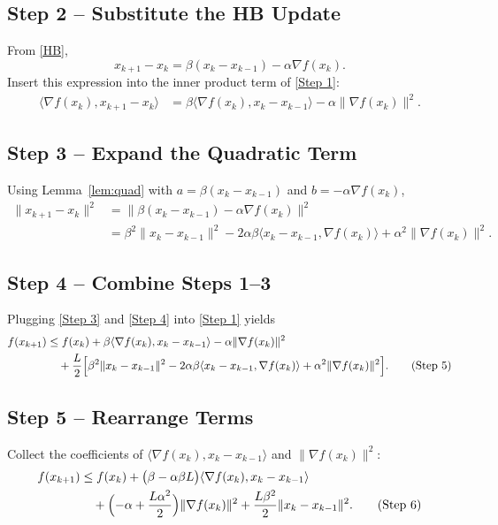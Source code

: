 \documentclass{article}
\begin{document}
\subsection*{Step 2 – Substitute the HB Update}
From \eqref{HB},
\[
x_{k+1}-x_k = \beta (x_k-x_{k-1})-\alpha \nabla f(x_k). \tag{Step 2}
\]
Insert this expression into the inner product term of \eqref{Step 1}:
\begin{align}
\bigl\langle\nabla f(x_k),x_{k+1}-x_k\bigr\rangle
&= \beta\langle\nabla f(x_k),x_k-x_{k-1}\rangle
   -\alpha\|\nabla f(x_k)\|^{2}. \tag{Step 3}
\end{align}

\subsection*{Step 3 – Expand the Quadratic Term}
Using Lemma~\ref{lem:quad} with $a=\beta (x_k-x_{k-1})$ and
$b=-\alpha \nabla f(x_k)$,
\begin{align}
\|x_{k+1}-x_k\|^{2}
&= \|\beta (x_k-x_{k-1})-\alpha \nabla f(x_k)\|^{2} \nonumber\\
&= \beta^{2}\|x_k-x_{k-1}\|^{2}
   -2\alpha\beta\langle x_k-x_{k-1},\nabla f(x_k)\rangle
   +\alpha^{2}\|\nabla f(x_k)\|^{2}. \tag{Step 4}
\end{align}

\subsection*{Step 4 – Combine Steps 1–3}
Plugging \eqref{Step 3} and \eqref{Step 4} into \eqref{Step 1} yields
\begin{align}
f(x_{k+1})
&\le f(x_k)
   +\beta\langle\nabla f(x_k),x_k-x_{k-1}\rangle
   -\alpha\|\nabla f(x_k)\|^{2} \nonumber\\
&\quad +\frac{L}{2}\Bigl[
        \beta^{2}\|x_k-x_{k-1}\|^{2}
        -2\alpha\beta\langle x_k-x_{k-1},\nabla f(x_k)\rangle
        +\alpha^{2}\|\nabla f(x_k)\|^{2}
        \Bigr]. \tag{Step 5}
\end{align}

\subsection*{Step 5 – Rearrange Terms}
Collect the coefficients of $\langle\nabla f(x_k),x_k-x_{k-1}\rangle$ and
$\|\nabla f(x_k)\|^{2}$:
\begin{align}
f(x_{k+1})
&\le f(x_k)
   +\bigl(\beta -\alpha\beta L\bigr)\langle\nabla f(x_k),x_k-x_{k-1}\rangle \nonumber\\
&\quad +\Bigl(-\alpha +\frac{L\alpha^{2}}{2}\Bigr)\|\nabla f(x_k)\|^{2}
   +\frac{L\beta^{2}}{2}\|x_k-x_{k-1}\|^{2}. \tag{Step 6}
\end{align}
\end{document}
